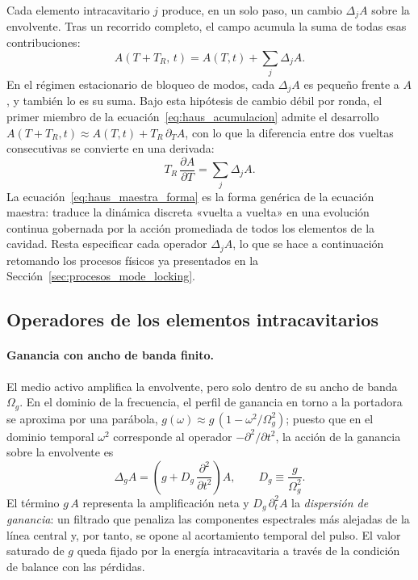 Cada elemento intracavitario $j$ produce, en un solo paso, un cambio
$\Delta_j A$ sobre la envolvente. Tras un recorrido completo, el campo acumula la
suma de todas esas contribuciones:
%
\begin{equation}
    A(T + T_R,\, t) = A(T,t) + \sum_j \Delta_j A .
    \label{eq:haus_acumulacion}
\end{equation}
%
En el régimen estacionario de bloqueo de modos, cada $\Delta_j A$ es pequeño
frente a $A$, y también lo es su suma. Bajo esta hipótesis de cambio débil por
ronda, el primer miembro de la ecuación~\eqref{eq:haus_acumulacion} admite el
desarrollo $A(T+T_R,t) \approx A(T,t) + T_R\,\partial_T A$, con lo que la
diferencia entre dos vueltas consecutivas se convierte en una derivada:
%
\begin{equation}
    T_R\,\frac{\partial A}{\partial T} = \sum_j \Delta_j A .
    \label{eq:haus_maestra_forma}
\end{equation}
%
La ecuación~\eqref{eq:haus_maestra_forma} es la forma genérica de la ecuación
maestra: traduce la dinámica discreta «vuelta a vuelta» en una evolución
continua gobernada por la acción promediada de todos los elementos de la cavidad.
Resta especificar cada operador $\Delta_j A$, lo que se hace a continuación
retomando los procesos físicos ya presentados en la
Sección~\ref{sec:procesos_mode_locking}.
 
\subsection{Operadores de los elementos intracavitarios}
 
\paragraph{Ganancia con ancho de banda finito.}
El medio activo amplifica la envolvente, pero solo dentro de su ancho de banda
$\Omega_g$. En el dominio de la frecuencia, el perfil de ganancia en torno a la
portadora se aproxima por una parábola, $g(\omega)\approx g\,(1-\omega^2/\Omega_g^2)$;
puesto que en el dominio temporal $\omega^2$ corresponde al operador
$-\partial^2/\partial t^2$, la acción de la ganancia sobre la envolvente es
%
\begin{equation}
    \Delta_{g} A = \left( g + D_g\,\frac{\partial^2}{\partial t^2} \right) A ,
    \qquad D_g \equiv \frac{g}{\Omega_g^2}.
    \label{eq:op_ganancia}
\end{equation}
%
El término $g\,A$ representa la amplificación neta y $D_g\,\partial_t^2 A$ la
\emph{dispersión de ganancia}: un filtrado que penaliza las componentes
espectrales más alejadas de la línea central y, por tanto, se opone al
acortamiento temporal del pulso. El valor saturado de $g$ queda fijado por la
energía intracavitaria a través de la condición de balance con las pérdidas.
 
